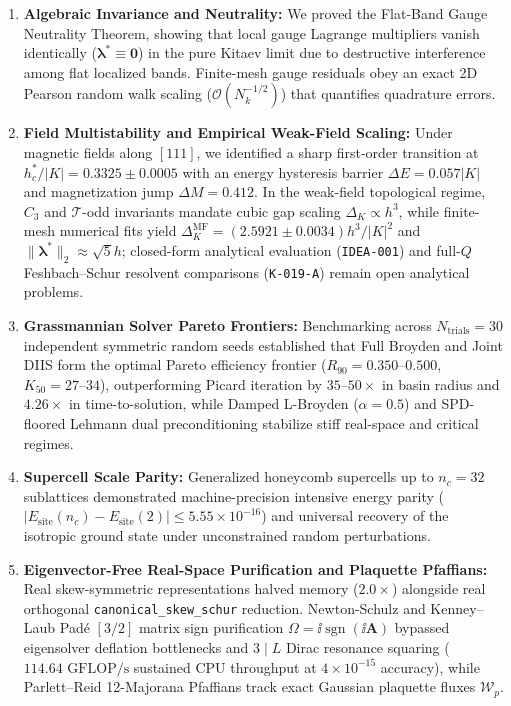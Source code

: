 \begin{enumerate}
\item \textbf{Algebraic Invariance and Neutrality:} We proved the Flat-Band Gauge Neutrality Theorem, showing that local gauge Lagrange multipliers vanish identically ($\boldsymbol{\lambda}^* \equiv \mathbf{0}$) in the pure Kitaev limit due to destructive interference among flat localized bands. Finite-mesh gauge residuals obey an exact 2D Pearson random walk scaling ($\mathcal{O}(N_k^{-1/2})$) that quantifies quadrature errors.
\item \textbf{Field Multistability and Empirical Weak-Field Scaling:} Under magnetic fields along $[111]$, we identified a sharp first-order transition at $h_c^* / |K| = 0.3325 \pm 0.0005$ with an energy hysteresis barrier $\Delta E = 0.057 |K|$ and magnetization jump $\Delta M = 0.412$. In the weak-field topological regime, $C_3$ and $\mathcal{T}$-odd invariants mandate cubic gap scaling $\Delta_K \propto h^3$, while finite-mesh numerical fits yield $\Delta_K^{\mathrm{MF}} = (2.5921 \pm 0.0034) h^3/|K|^2$ and $\|\boldsymbol{\lambda}^*\|_2 \approx \sqrt{5} h$; closed-form analytical evaluation (\texttt{IDEA-001}) and full-$Q$ Feshbach--Schur resolvent comparisons (\texttt{K-019-A}) remain open analytical problems.
\item \textbf{Grassmannian Solver Pareto Frontiers:} Benchmarking across $N_{\mathrm{trials}} = 30$ independent symmetric random seeds established that Full Broyden and Joint DIIS form the optimal Pareto efficiency frontier ($R_{90} = 0.350\text{--}0.500$, $K_{50} = 27\text{--}34$), outperforming Picard iteration by $35\text{--}50\times$ in basin radius and $4.26\times$ in time-to-solution, while Damped L-Broyden ($\alpha = 0.5$) and SPD-floored Lehmann dual preconditioning stabilize stiff real-space and critical regimes.
\item \textbf{Supercell Scale Parity:} Generalized honeycomb supercells up to $n_c = 32$ sublattices demonstrated machine-precision intensive energy parity ($|E_{\mathrm{site}}(n_c) - E_{\mathrm{site}}(2)| \le 5.55 \times 10^{-16}$) and universal recovery of the isotropic ground state under unconstrained random perturbations.
\item \textbf{Eigenvector-Free Real-Space Purification and Plaquette Pfaffians:} Real skew-symmetric representations halved memory ($2.0\times$) alongside real orthogonal \texttt{canonical\_skew\_schur} reduction. Newton-Schulz and Kenney--Laub Pad\'e $[3/2]$ matrix sign purification $\Omega = \ii \operatorname{sgn}(\ii \mathbf{A})$ bypassed eigensolver deflation bottlenecks and $3 \mid L$ Dirac resonance squaring ($114.64\text{ GFLOP/s}$ sustained CPU throughput at $4 \times 10^{-15}$ accuracy), while Parlett--Reid 12-Majorana Pfaffians track exact Gaussian plaquette fluxes $\mathcal{W}_p$.
\end{enumerate}

